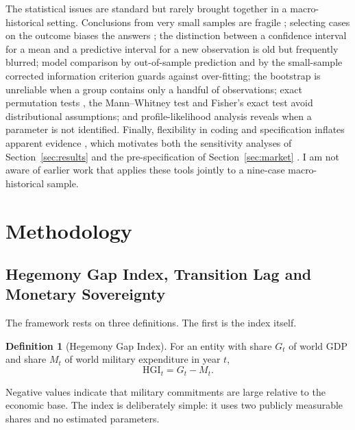 \documentclass[11pt,letterpaper]{article}
\theoremstyle{definition}
\newtheorem{definition}{Definition}[section]
\theoremstyle{plain}
\newcommand{\HGI}{\mathrm{HGI}}
\begin{document}
The statistical issues are standard but rarely brought together in a macro-historical setting. Conclusions from very small samples are fragile \citep{lieberson1991}; selecting cases on the outcome biases the answers \citep{geddes1990,king2001}; the distinction between a confidence interval for a mean and a predictive interval for a new observation is old \citep{geisser1993} but frequently blurred; model comparison by out-of-sample prediction \citep{stone1974} and by the small-sample corrected information criterion \citep{hurvich1989,burnham2002} guards against over-fitting; the bootstrap \citep{efron1979,efron1993} is unreliable when a group contains only a handful of observations; exact permutation tests \citep{phipson2010}, the Mann--Whitney test \citep{mann1947} and Fisher's exact test \citep{fisher1922} avoid distributional assumptions; and profile-likelihood analysis \citep{raue2009,seber1989} reveals when a parameter is not identified. Finally, flexibility in coding and specification inflates apparent evidence \citep{gelman2014}, which motivates both the sensitivity analyses of Section~\ref{sec:results} and the pre-specification of Section~\ref{sec:market} \citep{nosek2018}. I am not aware of earlier work that applies these tools jointly to a nine-case macro-historical sample.

\section{Methodology}\label{sec:method}

\subsection{Hegemony Gap Index, Transition Lag and Monetary Sovereignty}\label{sec:framework}
The framework rests on three definitions. The first is the index itself.

\begin{definition}[Hegemony Gap Index]\label{def:hgi}
For an entity with share $G_t$ of world GDP and share $M_t$ of world military expenditure in year $t$,
\begin{equation}
\HGI_t = G_t - M_t. \label{eq:hgi}
\end{equation}
\end{definition}

Negative values indicate that military commitments are large relative to the economic base. The index is deliberately simple: it uses two publicly measurable shares and no estimated parameters.
\end{document}
